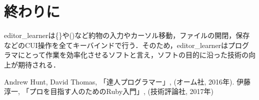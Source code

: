 \documentclass[a4j,twocolumn]{jsarticle}
\begin{document}
\section{終わりに}
editor\_learnerは\{\}や()など約物の入力やカーソル移動，ファイルの開閉，保存などのCUI操作を全てキーバインドで行う．そのため，editor\_learnerはプログラマにとって作業を効率化させるソフトと言え，ソフトの目的に沿った技術の向上が期待される．
\begin{thebibliography}{9}
 Andrew Hunt, David Thomas, 「達人プログラマー」, (オーム社, 2016年).
 伊藤淳一, 「プロを目指す人のためのRuby入門」, (技術評論社, 2017年)
\end{thebibliography}
\end{document}
